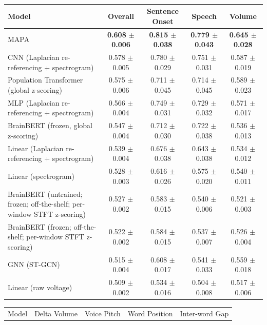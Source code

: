 \begin{table}[!htbp]
\small
{}\\[0.4em]
\hspace*{-2.5cm}\begin{tabular}{>{\raggedright\arraybackslash}p{8cm}cccc}
\hline
Model & Overall & Sentence Onset & Speech & Volume \\
\hline
MAPA & \textbf{0.608 $\pm$ 0.006} & \textbf{0.815 $\pm$ 0.038} & \textbf{0.779 $\pm$ 0.043} & \textbf{0.645 $\pm$ 0.028} \\
CNN (Laplacian re-referencing + spectrogram) & 0.578 $\pm$ 0.005 & 0.780 $\pm$ 0.029 & 0.751 $\pm$ 0.031 & 0.587 $\pm$ 0.019 \\
Population Transformer (global z-scoring) & 0.575 $\pm$ 0.006 & 0.711 $\pm$ 0.045 & 0.714 $\pm$ 0.045 & 0.589 $\pm$ 0.023 \\
MLP (Laplacian re-referencing + spectrogram) & 0.566 $\pm$ 0.004 & 0.749 $\pm$ 0.031 & 0.729 $\pm$ 0.032 & 0.571 $\pm$ 0.017 \\
BrainBERT (frozen, global z-scoring) & 0.547 $\pm$ 0.004 & 0.712 $\pm$ 0.030 & 0.722 $\pm$ 0.038 & 0.536 $\pm$ 0.013 \\
Linear (Laplacian re-referencing + spectrogram) & 0.539 $\pm$ 0.004 & 0.676 $\pm$ 0.038 & 0.643 $\pm$ 0.038 & 0.534 $\pm$ 0.012 \\
Linear (spectrogram) & 0.528 $\pm$ 0.003 & 0.616 $\pm$ 0.026 & 0.575 $\pm$ 0.020 & 0.540 $\pm$ 0.011 \\
BrainBERT (untrained; frozen; off-the-shelf; per-window STFT z-scoring) & 0.527 $\pm$ 0.002 & 0.583 $\pm$ 0.015 & 0.540 $\pm$ 0.006 & 0.521 $\pm$ 0.003 \\
BrainBERT (frozen; off-the-shelf; per-window STFT z-scoring) & 0.522 $\pm$ 0.002 & 0.584 $\pm$ 0.015 & 0.537 $\pm$ 0.007 & 0.526 $\pm$ 0.004 \\
GNN (ST-GCN) & 0.515 $\pm$ 0.004 & 0.608 $\pm$ 0.017 & 0.541 $\pm$ 0.033 & 0.559 $\pm$ 0.018 \\
Linear (raw voltage) & 0.509 $\pm$ 0.002 & 0.534 $\pm$ 0.016 & 0.504 $\pm$ 0.008 & 0.517 $\pm$ 0.006 \\
\hline
\end{tabular}
\hspace{1em}
\hspace*{-2.5cm}\begin{tabular}{>{\raggedright\arraybackslash}p{8cm}cccc}
\hline
Model & Delta Volume & Voice Pitch & Word Position & Inter-word Gap \\

\end{tabular}
\end{table}
